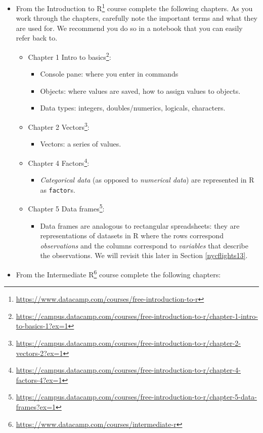 \documentclass[12pt,]{krantz}
\providecommand{\tightlist}{%
  \setlength{\itemsep}{0pt}\setlength{\parskip}{0pt}}
\renewcommand{\href}[2]{#2\footnote{\url{#1}}}
\begin{document}
\begin{itemize}
\tightlist
\item
  From the
  \href{https://www.datacamp.com/courses/free-introduction-to-r}{Introduction
  to R} course complete the following chapters. As you work through the
  chapters, carefully note the important terms and what they are used
  for. We recommend you do so in a notebook that you can easily refer
  back to.

  \begin{itemize}
  \tightlist
  \item
    \href{https://campus.datacamp.com/courses/free-introduction-to-r/chapter-1-intro-to-basics-1?ex=1}{Chapter
    1 Intro to basics}:

    \begin{itemize}
    \tightlist
    \item
      Console pane: where you enter in commands
    \item
      Objects: where values are saved, how to assign values to objects.
    \item
      Data types: integers, doubles/numerics, logicals, characters.\\
    \end{itemize}
  \item
    \href{https://campus.datacamp.com/courses/free-introduction-to-r/chapter-2-vectors-2?ex=1}{Chapter
    2 Vectors}:

    \begin{itemize}
    \tightlist
    \item
      Vectors: a series of values.
    \end{itemize}
  \item
    \href{https://campus.datacamp.com/courses/free-introduction-to-r/chapter-4-factors-4?ex=1}{Chapter
    4 Factors}:

    \begin{itemize}
    \tightlist
    \item
      \emph{Categorical data} (as opposed to \emph{numerical data}) are
      represented in R as \texttt{factor}s.
    \end{itemize}
  \item
    \href{https://campus.datacamp.com/courses/free-introduction-to-r/chapter-5-data-frames?ex=1}{Chapter
    5 Data frames}:

    \begin{itemize}
    \tightlist
    \item
      Data frames are analogous to rectangular spreadsheets: they are
      representations of datasets in R where the rows correspond
      \emph{observations} and the columns correspond to \emph{variables}
      that describe the observations. We will revisit this later in
      Section \ref{nycflights13}.
    \end{itemize}
  \end{itemize}
\item
  From the
  \href{https://www.datacamp.com/courses/intermediate-r}{Intermediate R}
  course complete the following chapters:


\end{itemize}
\end{document}
